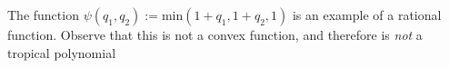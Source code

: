 

    The function $\psi(q_1, q_2):= \text{min}(1+q_1, 1+q_2, 1)$ is an example of a rational function. Observe that this is not a convex function, and therefore is \emph{not} a tropical polynomial

